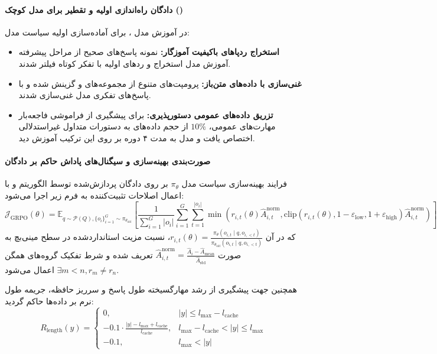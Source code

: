 \paragraph*{دادگان راه‌اندازی اولیه و تقطیر برای مدل کوچک ()}
در آموزش مدل ، برای آماده‌سازی اولیه سیاست مدل:
\begin{itemize}
    \item \textbf{استخراج ردپاهای باکیفیت آموزگار:} نمونه پاسخ‌های صحیح از مراحل پیشرفته آموزش  مدل  استخراج و ردهای اولیه با تفکر کوتاه فیلتر شدند.
    \item \textbf{غنی‌سازی با داده‌های متن‌باز:} پرومپت‌های متنوع از مجموعه‌های  \cite{guha2025openthoughts} و  \cite{openr1_2025} گزینش شده و با پاسخ‌های تفکری مدل  غنی‌سازی شدند.
    \item \textbf{تزریق داده‌های عمومی دستورپذیری:} برای پیشگیری از فراموشی فاجعه‌بار مهارت‌های عمومی، $10\%$ از حجم داده‌های  به دستورات متداول غیر‌استدلالی اختصاص یافت و مدل به مدت ۴ دوره بر روی این ترکیب آموزش دید.
\end{itemize}

\paragraph*{صورت‌بندی بهینه‌سازی و سیگنال‌های پاداش حاکم بر دادگان}
فرایند بهینه‌سازی سیاست مدل $\pi_\theta$ بر روی دادگان پردازش‌شده توسط الگوریتم  \cite{shao2024deepseekmath} و با اعمال اصلاحات تثبیت‌کننده به فرم زیر اجرا می‌شود:
\begin{equation}
    \mathcal{J}_{\text{GRPO}}(\theta) = \mathbb{E}_{q \sim \mathcal{P}(Q), \{o_i\}_{i=1}^G \sim \pi_{\theta_{\text{old}}}} \left[ \frac{1}{\sum_{i=1}^G |o_i|} \sum_{i=1}^G \sum_{t=1}^{|o_i|} \min \left( r_{i,t}(\theta) \hat{A}_{i,t}^{\text{norm}}, \text{clip}(r_{i,t}(\theta), 1 - \varepsilon_{\text{low}}, 1 + \varepsilon_{\text{high}}) \hat{A}_{i,t}^{\text{norm}} \right) \right]
\end{equation}
که در آن $r_{i,t}(\theta) = \frac{\pi_\theta(o_{i,t} \mid q, o_{i,<t})}{\pi_{\theta_{\text{old}}}(o_{i,t} \mid q, o_{i,<t})}$، نسبت مزیت استانداردشده در سطح مینی‌بچ به صورت $\hat{A}_{i,t}^{\text{norm}} = \frac{\hat{A}_i - \hat{A}_{\text{mean}}}{\hat{A}_{\text{std}}}$ تعریف شده و شرط تفکیک گروه‌های همگن $\exists m < n, r_m \neq r_n$ اعمال می‌شود.

همچنین جهت پیشگیری از رشد مهارگسیخته طول پاسخ و سرریز حافظه، جریمه طول نرم بر داده‌ها حاکم گردید:
\begin{equation}
    R_{\text{length}}(y) = \begin{cases} 
        0, & |y| \le l_{\text{max}} - l_{\text{cache}} \\ 
        -0.1 \cdot \frac{|y| - l_{\text{max}} + l_{\text{cache}}}{l_{\text{cache}}}, & l_{\text{max}} - l_{\text{cache}} < |y| \le l_{\text{max}} \\ 
        -0.1, & l_{\text{max}} < |y| 
    \end{cases}
\end{equation}

